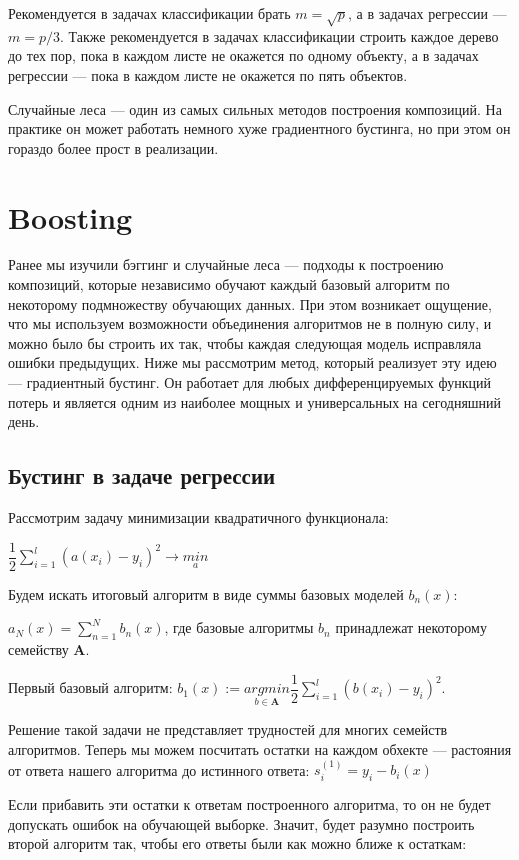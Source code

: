 \documentclass{article}
\begin{document}
Рекомендуется в задачах классификации брать $m=\sqrt{p}$, а в задачах регрессии --- $m=p/3$. Также рекомендуется в задачах классификации строить каждое дерево до тех пор, пока в каждом листе не окажется по одному объекту, а в задачах регрессии — пока в каждом листе не окажется по пять объектов. 

Случайные леса --- один из самых сильных методов построения композиций. На практике он может работать немного хуже градиентного бустинга, но при этом он гораздо более прост в реализации.

\section{Boosting}

Ранее мы изучили бэггинг и случайные леса — подходы к построению композиций, которые независимо обучают каждый базовый алгоритм по некоторому подмножеству обучающих данных. При этом возникает ощущение, что мы используем
возможности объединения алгоритмов не в полную силу, и можно было бы строить их так, чтобы каждая следующая модель исправляла ошибки предыдущих. Ниже мы рассмотрим метод, который реализует эту идею — градиентный бустинг. Он работает для любых дифференцируемых функций потерь и является одним из наиболее мощных и универсальных на сегодняшний день.

\subsection{Бустинг в задаче регрессии}

Рассмотрим задачу минимизации квадратичного функционала:

$\dfrac{1}{2}\sum_{i=1}^{l}(a(x_i)-y_i)^2 \rightarrow \underset{a}{min}$

Будем искать итоговый алгоритм в виде суммы базовых моделей $b_n(x)$:

$a_N(x) = \sum_{n=1}^{N}b_n(x)$, где базовые алгоритмы $b_n$ принадлежат некоторому семейству $\mathbf{A}$.

Первый базовый алгоритм: $b_1(x):= \underset{b\in\mathbf{A}}{argmin} \dfrac{1}{2}\sum_{i=1}^{l}(b(x_i)-y_i)^2$.

Решение такой задачи не представляет трудностей для многих семейств алгоритмов. Теперь мы можем посчитать остатки на каждом обхекте --- растояния от ответа нашего алгоритма до истинного ответа: $s^{(1)}_i = y_i - b_i(x)$

Если прибавить эти остатки к ответам построенного алгоритма, то он не будет допускать ошибок на обучающей выборке. Значит, будет разумно построить второй алгоритм так, чтобы его ответы были как можно ближе к остаткам:
\end{document}
